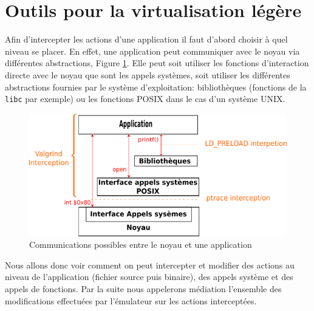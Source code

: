 \section{Outils pour la virtualisation légère}
\label{section:tools}

Afin d'intercepter les actions d'une application il faut d'abord choisir à quel
niveau se placer.  En effet, une application peut communiquer avec le noyau via
différentes abstractions, Figure \ref{AS_Communication}. Elle peut soit utiliser
les fonctions d'interaction directe avec le noyau que sont les appels systèmes,
soit utiliser les différentes abstractions fournies par le système
d'exploitation: bibliothèques (fonctions de la \texttt{libc} par exemple) ou les
fonctions POSIX dans le cas d'un système UNIX.

\begin{figure}[H]
 \centering
 \includegraphics[scale=0.75]{Pictures/png/Communication_application_noyau_v3.png}
 \caption{Communications possibles entre le noyau et une application}
 \label{AS_Communication}
\end{figure}

Nous allons donc voir comment on peut intercepter et modifier des actions au
niveau de l'application (fichier source puis binaire), des appels système et
des appels de fonctions. Par la suite nous appelerons médiation l'ensemble des
modifications effectuées par l'émulateur sur les actions interceptées.


